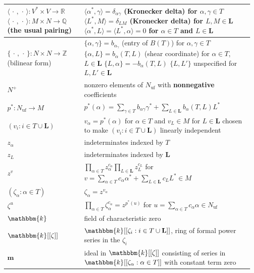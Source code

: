 \documentclass{amsart}
\theoremstyle{definition}
\theoremstyle{remark}
\numberwithin{equation}{section}
\newcommand{\integers}{\mathbb Z}
\newcommand{\rationals}{\mathbb Q}
\newcommand{\reals}{\mathbb R}
\newcommand{\uf}{{\operatorname{uf}}}
\newcommand{\set}[1]{{\lbrace #1 \rbrace}}
\newcommand{\br}[1]{{\langle #1 \rangle}}
\newcommand{\0}{{\mathbf{0}}}
\newcommand{\m}{\mathbf{m}}
\renewcommand{\k}{\mathbbm{k}}
\renewcommand{\L}{\mathbf{L}}
\begin{document}
\begin{longtable}{P{88.5pt}|P{248pt}}
$\br{\,\cdot\,,\,\cdot\,}:V^*\times V\to\reals$\linebreak
$\br{\,\cdot\,,\,\cdot\,}:M\times N\to\rationals$\linebreak
(the usual pairing)& 
$\br{\alpha^*,\gamma}=\delta_{\alpha\gamma}$ (Kronecker delta) for $\alpha,\gamma\in T$\linebreak
$\br{L^*,M}=\delta_{LM}$ (Kronecker delta) for $L,M\in\L$\linebreak
$\br{\alpha^*,L}=\br{L^*,\alpha}=0$ for $\alpha\in T$ and $L\in\L$
\\\hline
$\set{\,\cdot\,,\,\cdot\,}:N\times N\to\integers$\linebreak
(bilinear form)&$\set{\alpha,\gamma}=b_{\alpha_\gamma}$ (entry of $B(T)$) for $\alpha,\gamma\in T$\linebreak
$\set{\alpha,L}=b_\alpha(T,L)$ (shear coordinate) for $\alpha\in T$, $L\in\L$\linebreak
$\set{L,\alpha}=-b_\alpha(T,L)$\linebreak
$\set{L,L'}$ unspecified for $L,L'\in\L$
\\\hline
$N^+$& nonzero elements of $N_\uf$ with \textbf{nonnegative} coefficients\\\hline
$p^*:N_\uf\to M$&
$p^*(\alpha)=\sum_{\gamma\in T}b_{\alpha\gamma}\gamma^*+\sum_{L\in\L}b_\alpha(T,L)L^*$\\\hline
$(v_i:i\in T\cup\L)$&$v_\alpha=p^*(\alpha)$ for $\alpha\in T$ and
$v_L\in M$ for $L\in\L$ chosen to make $(v_i:i\in T\cup\L)$ linearly independent
\\\hline
$z_\alpha$&indeterminates indexed by $T$\\\hline
$z_L$&indeterminates indexed by $\L$\\\hline
$z^v$&$\displaystyle\prod_{\alpha\in T}z_\alpha^{c_\alpha}\prod_{L\in\L}z_L^{c_L}$ for $\displaystyle v=\sum_{\alpha\in T}c_\alpha\alpha^*+\sum_{L\in\L}c_LL^*\in M$\\\hline
$(\zeta_\alpha:\alpha\in T)$&$\zeta_\alpha=z^{v_\alpha}$\\\hline
$\zeta^u$&$\displaystyle\prod_{\alpha\in T}\zeta_\alpha^{c_\alpha}=z^{p^*(u)}$ for $\displaystyle u=\sum_{\alpha\in T}c_\alpha\alpha\in N_\uf$\\\hline
$\k$&field of characteristic zero\\\hline
$\k[[\zeta]]$&$\k[[\zeta_i:i\in T\cup\L]]$, ring of formal power series in the $\zeta_i$\\\hline
$\m$&ideal in $\k[[\zeta]]$ consisting of series in $\k[[\zeta_\alpha:\alpha\in T]]$ with constant term zero\\\hline
\end{longtable}
\end{document}
